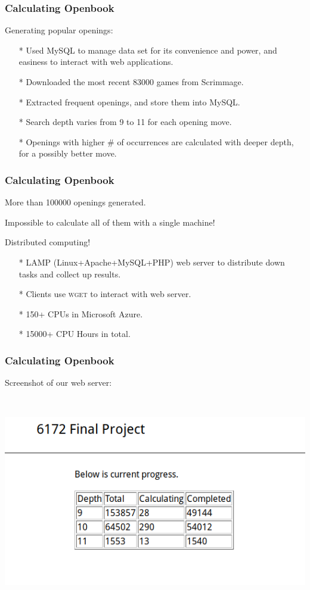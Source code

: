 \documentclass[10pt]{beamer}
\begin{document}
	\begin{frame}
		\frametitle{Calculating Openbook}
		Generating popular openings:
		\begin{itemize}
		\item[*] Used MySQL to manage data set for its convenience and power,
		and easiness to interact with web applications.
		\item[*] Downloaded the most recent 83000 games from Scrimmage.
		\item[*] Extracted frequent openings, and store them into MySQL.
		\item[*] Search depth varies from \textcolor{fgreen}{9} to \textcolor{fgreen}{11} for each opening move.
		\item[*] Openings with higher \# of occurrences are calculated with deeper depth, for a possibly better move.
		\end{itemize}
	\end{frame}

	\begin{frame}
		\frametitle{Calculating Openbook}
		More than \textcolor{dred}{100000} openings generated.

		Impossible to calculate all of them with a single machine!\pause

		\textcolor{fgreen}{Distributed computing!}

		\begin{itemize}
		\item[*] LAMP (Linux+Apache+MySQL+PHP) web server to distribute down tasks and collect up results.
		\item[*] Clients use \textsc{wget} to interact with web server.
		\item[*] \textcolor{fgreen}{150+} CPUs in Microsoft Azure.
		\item[*] \textcolor{fgreen}{15000+} CPU Hours in total.
		\end{itemize}
	\end{frame}

	\begin{frame}
		\frametitle{Calculating Openbook}

		Screenshot of our web server:

		\

		\includegraphics[scale=0.5]{screenshot1.png}
	\end{frame}
\end{document}
